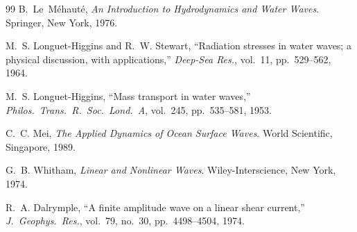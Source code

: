 \documentclass[journal,10pt,twocolumn]{IEEEtran}
\begin{document}
\begin{thebibliography}{99}
    B.~Le~M\'ehaut\'e,
    \emph{An Introduction to Hydrodynamics and Water Waves}.
    Springer, New York, 1976.

    M.~S. Longuet-Higgins and R.~W. Stewart,
    ``Radiation stresses in water waves; a physical discussion,
    with applications,''
    \emph{Deep-Sea Res.}, vol.~11, pp.~529--562, 1964.

    M.~S. Longuet-Higgins,
    ``Mass transport in water waves,''
    \emph{Philos.\ Trans.\ R.\ Soc.\ Lond.\ A},
    vol.~245, pp.~535--581, 1953.

    C.~C. Mei,
    \emph{The Applied Dynamics of Ocean Surface Waves}.
    World Scientific, Singapore, 1989.

    G.~B. Whitham,
    \emph{Linear and Nonlinear Waves}.
    Wiley-Interscience, New York, 1974.

    R.~A. Dalrymple,
    ``A finite amplitude wave on a linear shear current,''
    \emph{J.\ Geophys.\ Res.}, vol.~79, no.~30,
    pp.~4498--4504, 1974.

\end{thebibliography}
\end{document}
